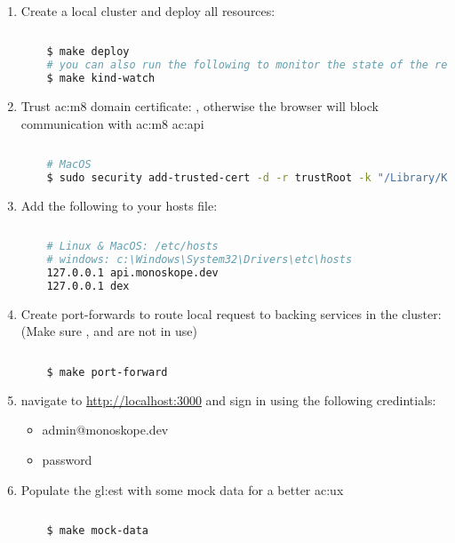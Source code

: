 \begin{enumerate}
  \item Create a local cluster and deploy all resources:

  \begin{lstlisting}[language=bash, caption={Deploy all resources to a local cluster}, label={sh:dartlc}]
    
    $ make deploy
    # you can also run the following to monitor the state of the resources
    $ make kind-watch
  \end{lstlisting}

  \item Trust \gls{ac:m8} domain certificate: , otherwise the browser will block communication with \gls{ac:m8} \gls{ac:api}

  \begin{lstlisting}[language=bash, caption={Trust \gls{ac:m8} domain certificate}, label={sh:tmdc}]
    
    # MacOS
    $ sudo security add-trusted-cert -d -r trustRoot -k "/Library/Keychains/System.keychain" tmp/domain-ca.crt
  \end{lstlisting}

  \item Add the following to your hosts file:

  \begin{lstlisting}[language=bash, caption={Update hosts file}, label={sh:uhf}]
    
    # Linux & MacOS: /etc/hosts
    # windows: c:\Windows\System32\Drivers\etc\hosts
    127.0.0.1 api.monoskope.dev
    127.0.0.1 dex
  \end{lstlisting}

  \item Create port-forwards to route local request to backing services in the cluster: (Make sure ,  and  are not in use)

  \begin{lstlisting}[language=bash, caption={Create port-forwards to route local request}, label={sh:cpf}]
    
    $ make port-forward
  \end{lstlisting}

  \item navigate to \href{http://localhost:3000}{http://localhost:3000} and sign in using the following credintials:
  
  \begin{itemize}
    \item {} admin@monoskope.dev
    \item {} password
  \end{itemize}

  \item Populate the \gls{gl:est} with some mock data for a better \gls{ac:ux}

  \begin{lstlisting}[language=bash, caption={Populate the \gls{gl:est} with some mock}, label={sh:pemd}]
    
    $ make mock-data
  \end{lstlisting}
\end{enumerate}
